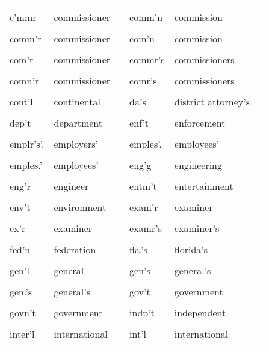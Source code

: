 \documentclass[10pt, letterpaper]{article}
\begin{document}
\begin{spacing}{1.0}
\begin{footnotesize}
\begin{longtable}[H]{p{1in}>{\raggedright}p{2in} p{0.2in} p{1in}>{\raggedright}p{2in} p{0in}}
    &  &  &  &  & \\[-6pt]
    c'mmr & commissioner & & comm'n & commission &\\
    &  &  &  &  & \\[-6pt]
    comm'r & commissioner & & com'n & commission &\\
    &  &  &  &  & \\[-6pt]
    com'r & commissioner & & commr's & commissioners &\\
    &  &  &  &  & \\[-6pt]
    comn'r & commissioner & & comr's & commissioners &\\
    &  &  &  &  & \\[-6pt]
    cont'l & continental & & da's & district attorney's &\\
    &  &  &  &  & \\[-6pt]
    dep't & department & & enf't & enforcement &\\
    &  &  &  &  & \\[-6pt]
    emplr's'. & employers' & & emples'. & employees' &\\
    &  &  &  &  & \\[-6pt]
    emples.' & employees' & & eng'g & engineering &\\
    &  &  &  &  & \\[-6pt]
    eng'r & engineer & & entm't & entertainment &\\
    &  &  &  &  & \\[-6pt]
    env't & environment & & exam'r & examiner &\\
    &  &  &  &  & \\[-6pt]
    ex'r & examiner & & examr's & examiner's &\\
    &  &  &  &  & \\[-6pt]
    fed'n & federation & & fla.'s & florida's &\\
    &  &  &  &  & \\[-6pt]
    gen'l & general & & gen's & general's &\\
    &  &  &  &  & \\[-6pt]
    gen.'s & general's & & gov't & government &\\
    &  &  &  &  & \\[-6pt]
    govn't & government & & indp't & independent &\\
    &  &  &  &  & \\[-6pt]
    inter'l & international & & int'l & international &\\
    &  &  &  &  & \\[-6pt]

\end{longtable}
\end{footnotesize}
\end{spacing}
\end{document}
